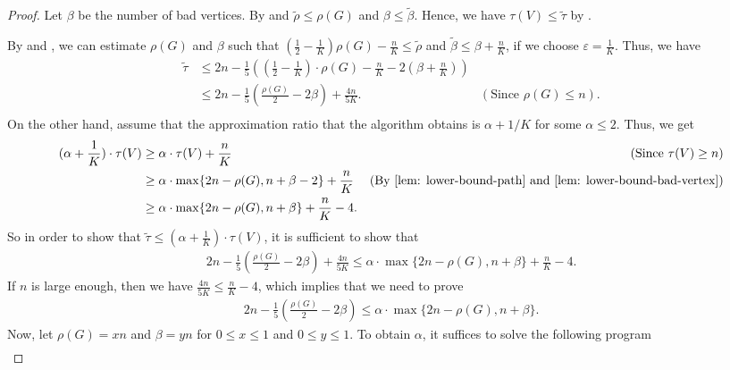 \documentclass[letterpaper,11pt]{article}
\renewcommand{\epsilon}{\varepsilon}
\newcommand{\tspsize}[1]{\ensuremath{\tau}(#1)}
\newenvironment{myproof}{
\vspace{-0.5cm}
\begin{proof}
}{
\end{proof}
}
\begin{document}
\begin{myproof}
Let $\beta$ be the number of bad vertices. By  and  $\tilde{\rho} \leq \rho(G)$ and $\beta \leq \tilde{\beta}$. Hence, we have $\tspsize{V} \leq \tilde{\tau}$ by .

By  and , we can estimate $\rho(G)$ and $\beta$ such that $\left(\frac{1}{2} - \frac{1}{K} \right)\rho(G) - \frac{n}{K} \leq \tilde{\rho}$ and $\tilde{\beta} \leq \beta + \frac{n}{K}$, if we choose $\epsilon = \frac{1}{K}$. Thus, we have
\begin{align*}
    \tilde{\tau} & \leq 2n - \frac{1}{5}\left( (\frac{1}{2} - \frac{1}{K})\cdot \rho(G) - \frac{n}{K} - 2(\beta + \frac{n}{K}) \right) \\
    & \leq 2n - \frac{1}{5}(\frac{\rho(G)}{2} - 2\beta) + \frac{4n}{5K}.& (\text{Since } \rho(G) \leq n). \\
\end{align*}
On the other hand, assume that the approximation ratio that the algorithm obtains is $\alpha + 1/K$ for some $\alpha \leq 2$. Thus, we get 
\begin{align*}
    (\alpha+ \frac{1}{K})\cdot \tau(V) & \geq \alpha\cdot\tau(V) + \frac{n}{K} & (\text{Since } \tau(V) \geq n) \\ 
    & \geq \alpha\cdot \max\{2n - \rho(G), n + \beta - 2\} + \frac{n}{K} & (\text{By  \Cref{lem: lower-bound-path}  and  \Cref{lem: lower-bound-bad-vertex}})\\
    & \geq \alpha\cdot \max\{2n - \rho(G), n + \beta\} + \frac{n}{K} - 4.
\end{align*}
So in order to show that $\tilde{\tau} \leq (\alpha + \frac{1}{K}) \cdot\tspsize{V}$, it is sufficient to show that 
\begin{align*}
2n - \frac{1}{5}(\frac{\rho(G)}{2} - 2\beta) + \frac{4n}{5K} \leq \alpha\cdot \max\{2n - \rho(G), n + \beta\} + \frac{n}{K} - 4.
\end{align*}
If $n$ is large enough, then we have $\frac{4n}{5K} \leq \frac{n}{K} - 4$, which implies that we need to prove
\begin{align*}
    2n - \frac{1}{5}(\frac{\rho(G)}{2} - 2\beta) \leq \alpha\cdot \max\{2n - \rho(G), n + \beta\}.
\end{align*}
Now, let $\rho(G) = xn$ and $\beta = yn$ for $0 \leq x \leq 1$ and $ 0\leq y \leq 1$. To obtain $\alpha$, it suffices to solve the following program
\begin{align*}

\end{align*}
\end{myproof}
\end{document}
